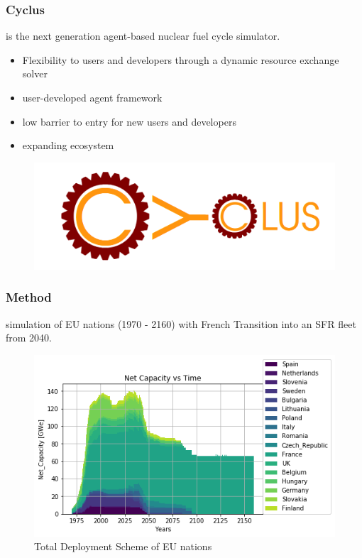 \begin{frame}
	\frametitle{Cyclus}
	\Cyclus is the next generation agent-based nuclear \cite{huff_fundamental_2016}
	fuel cycle simulator.
	\begin{minipage}[b]{.45\linewidth}
	\begin{itemize}
		\item Flexibility to users and developers through a dynamic resource exchange solver
		\item user-developed agent framework
		\item low barrier to entry for new users and developers
		\item expanding ecosystem
	\end{itemize}
	\end{minipage}
	\hspace{.5cm}
	\begin{minipage}[b]{.45\linewidth}
	\begin{figure}
		\begin{center}
			\includegraphics[width=\textwidth]{./images/cyclus.png}
		\end{center}
	\end{figure}
	\end{minipage}

\end{frame}


\begin{frame}
	\frametitle{Method}
	\Cyclus simulation of \gls{EU} nations (1970 - 2160) with 
	French Transition into an \gls{SFR} fleet from 2040.

\begin{figure}[htbp!]
        \begin{center}
                \includegraphics[width=.8\textwidth]{./images/onesim/power_plot.png}
        \end{center}
        \caption{Total Deployment Scheme of \gls{EU} nations}
        \label{fig:eu_dep}

\end{figure}

\end{frame}

